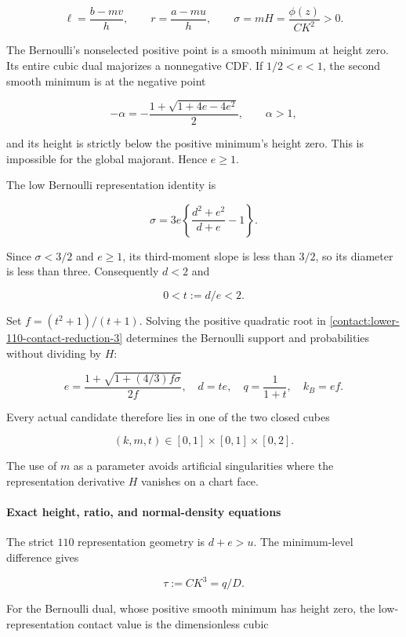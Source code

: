 \[
 \ell=\frac{b-mv}{h},\qquad r=\frac{a-mu}{h},
 \qquad \sigma=mH=\frac{\phi(z)}{CK^2}>0.
\tag{B.13.2}\label{contact:lower-110-contact-reduction-2}
\]

The Bernoulli's nonselected positive point is a smooth minimum at height
zero. Its entire cubic dual majorizes a nonnegative CDF. If $1/2<e<1$,
the second smooth minimum is at the negative point

\[
 -\alpha=-\frac{1+\sqrt{1+4e-4e^2}}2,\qquad \alpha>1,
\]

and its height is strictly below the positive minimum's height zero.
This is impossible for the global majorant. Hence $e\ge 1$.

The low Bernoulli representation identity is

\[
 \sigma=3e\left\{\frac{d^2+e^2}{d+e}-1\right\}.
\tag{B.13.3}\label{contact:lower-110-contact-reduction-3}
\]

Since $\sigma<3/2$ and $e\ge 1$, its third-moment slope is less than $3/2$,
so its diameter is less than three. Consequently $d<2$ and

\[
 0<t:=d/e<2.
\]

Set $f=(t^2+1)/(t+1)$. Solving the positive quadratic root in \eqref{contact:lower-110-contact-reduction-3}
determines the Bernoulli support and probabilities without dividing by $H$:

\[
 \boxed{\quad e=\frac{1+\sqrt{1+(4/3)f\sigma}}{2f},\quad
 d=te,\quad q=\frac1{1+t},\quad k_B=ef.\quad}
\tag{B.13.4}\label{contact:lower-110-contact-reduction-4}
\]

Every actual candidate therefore lies in one of the two closed cubes

\[
 \boxed{\quad (k,m,t)\in[0,1]\times[0,1]\times[0,2].\quad}
\tag{B.13.5}\label{contact:lower-110-contact-reduction-5}
\]

The use of $m$ as a parameter avoids artificial singularities where the
representation derivative $H$ vanishes on a chart face.

\paragraph{Exact height, ratio, and normal-density equations}

The strict $110$ representation geometry is $d+e>u$. The minimum-level difference
gives

\[
 \tau:=CK^3=q/D.
\]

For the Bernoulli dual, whose positive smooth minimum has height zero,
the low-representation contact value is the dimensionless cubic

